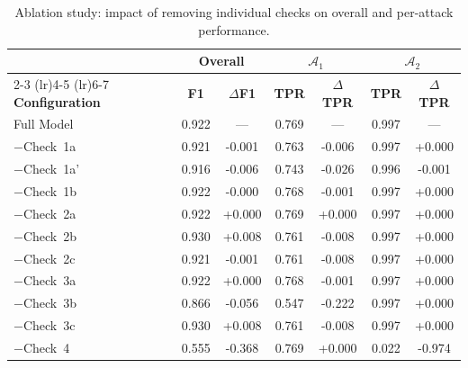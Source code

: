 \begin{table}[t]
\centering
\caption{Ablation study: impact of removing individual checks on overall and per-attack performance.}
\label{tab:ablation}
\small
\begin{tabular}{@{}lcccccc@{}}
\toprule
 & \multicolumn{2}{c}{\textbf{Overall}} & \multicolumn{2}{c}{$\mathcal{A}_1$} & \multicolumn{2}{c}{$\mathcal{A}_2$} \\
\cmidrule(lr){2-3} \cmidrule(lr){4-5} \cmidrule(lr){6-7}
\textbf{Configuration} & \textbf{F1} & $\Delta$\textbf{F1} & \textbf{TPR} & $\Delta$\textbf{TPR} & \textbf{TPR} & $\Delta$\textbf{TPR} \\
\midrule
Full Model & 0.922 & --- & 0.769 & --- & 0.997 & --- \\
\midrule
$-$Check~1a & 0.921 & -0.001 & 0.763 & -0.006 & 0.997 & +0.000 \\
$-$Check~1a' & 0.916 & -0.006 & 0.743 & -0.026 & 0.996 & -0.001 \\
$-$Check~1b & 0.922 & -0.000 & 0.768 & -0.001 & 0.997 & +0.000 \\
$-$Check~2a & 0.922 & +0.000 & 0.769 & +0.000 & 0.997 & +0.000 \\
$-$Check~2b & 0.930 & +0.008 & 0.761 & -0.008 & 0.997 & +0.000 \\
$-$Check~2c & 0.921 & -0.001 & 0.761 & -0.008 & 0.997 & +0.000 \\
$-$Check~3a & 0.922 & +0.000 & 0.768 & -0.001 & 0.997 & +0.000 \\
$-$Check~3b & 0.866 & -0.056 & 0.547 & -0.222 & 0.997 & +0.000 \\
$-$Check~3c & 0.930 & +0.008 & 0.761 & -0.008 & 0.997 & +0.000 \\
$-$Check~4 & 0.555 & -0.368 & 0.769 & +0.000 & 0.022 & -0.974 \\
\bottomrule
\end{tabular}
\end{table}